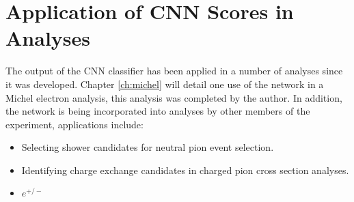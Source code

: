\section{Application of CNN Scores in \protodune{} Analyses} \label{cnn-appl}

The output of the CNN classifier has been applied in a number of \protodune{}
analyses since it was developed. Chapter \ref{ch:michel} will detail one use of
the network in a Michel electron analysis, this analysis was completed by the
author. In addition, the network is being incorporated into analyses by other
members of the \protodune{} experiment, applications include:
\begin{itemize}
	\item Selecting shower candidates for neutral pion event selection. 
		\cite{Milo}
	\item Identifying charge exchange candidates in charged pion cross section 
		analyses. \cite{Jake, Francesca} \item $e^{+/-}$ 
\end{itemize}

